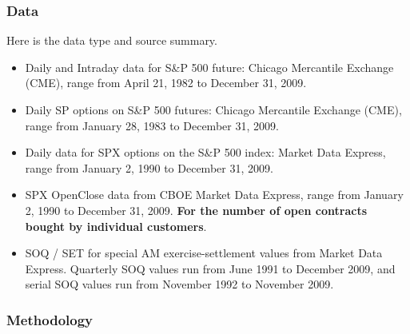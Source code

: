 \documentclass[10pt]{report}
\begin{document}
\subsubsection{Data}
Here is the data type and source summary.
\begin{itemize}
    \item Daily and Intraday data for S\&P 500 future: Chicago Mercantile Exchange (CME), range from April 21, 1982 to December 31, 2009.
    \item Daily SP options on S\&P 500 futures: Chicago Mercantile Exchange (CME), range from January 28, 1983 to December 31, 2009.
    \item Daily data for SPX options on the S\&P 500 index: Market Data Express, range from January 2, 1990 to December 31, 2009.
    \item SPX OpenClose data from CBOE Market Data Express, range from January 2, 1990 to December 31, 2009. \textbf{For the number of open contracts bought by individual customers}.
    \item SOQ / SET for special AM exercise-settlement values from Market Data Express. Quarterly SOQ values run from June 1991 to December 2009, and serial SOQ values run from November 1992 to November 2009.
\end{itemize}

\subsubsection{Methodology}
\end{document}
